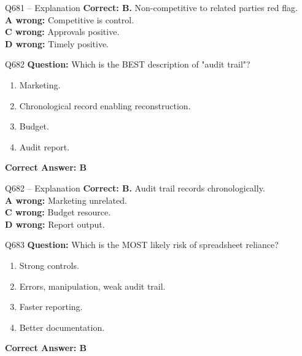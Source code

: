 \documentclass[aspectratio=169,10pt]{beamer}
\begin{document}
	\begin{frame}[t]{Q681 -- Explanation}
		\small
		\textbf{Correct: B.} Non-competitive to related parties red flag. \\[4pt]
		\textbf{A wrong:} Competitive is control. \\[2pt]
		\textbf{C wrong:} Approvals positive. \\[2pt]
		\textbf{D wrong:} Timely positive.
	\end{frame}
	
	\begin{frame}[t]{Q682}
		\small
		\textbf{Question:} Which is the BEST description of "audit trail"?
		\begin{enumerate}[label=\Alph*.,itemsep=1pt,topsep=2pt]
			\item Marketing.
			\item Chronological record enabling reconstruction.
			\item Budget.
			\item Audit report.
		\end{enumerate}
		\vspace{4pt}
		\textbf{Correct Answer: B}
	\end{frame}
	
	\begin{frame}[t]{Q682 -- Explanation}
		\small
		\textbf{Correct: B.} Audit trail records chronologically. \\[4pt]
		\textbf{A wrong:} Marketing unrelated. \\[2pt]
		\textbf{C wrong:} Budget resource. \\[2pt]
		\textbf{D wrong:} Report output.
	\end{frame}
	
	\begin{frame}[t]{Q683}
		\small
		\textbf{Question:} Which is the MOST likely risk of spreadsheet reliance?
		\begin{enumerate}[label=\Alph*.,itemsep=1pt,topsep=2pt]
			\item Strong controls.
			\item Errors, manipulation, weak audit trail.
			\item Faster reporting.
			\item Better documentation.
		\end{enumerate}
		\vspace{4pt}
		\textbf{Correct Answer: B}
	\end{frame}
	
\end{document}
